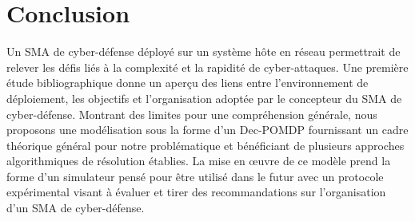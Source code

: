 \section{Conclusion}
Un SMA de cyber-défense déployé sur un système hôte en réseau permettrait de relever les défis liés à la complexité et la rapidité de cyber-attaques. Une première étude bibliographique donne un aperçu des liens entre l'environnement de déploiement, les objectifs et l'organisation adoptée par le concepteur du SMA de cyber-défense.
Montrant des limites pour une compréhension générale, nous proposons une modélisation sous la forme d'un Dec-POMDP fournissant un cadre théorique général pour notre problématique et bénéficiant de plusieurs approches algorithmiques de résolution établies. La mise en œuvre de ce modèle prend la forme d'un simulateur pensé pour être utilisé dans le futur avec un protocole expérimental visant à évaluer et tirer des recommandations sur l'organisation d'un SMA de cyber-défense.
